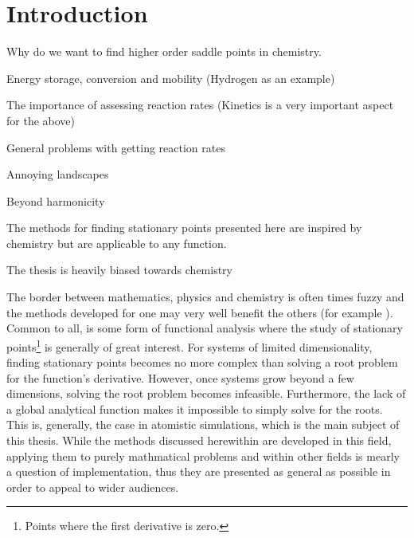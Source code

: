 \chapter{Introduction}
\label{chap:introduction}

\bit
\item Why do we want to find higher order saddle points in chemistry.
\item Energy storage, conversion and mobility (Hydrogen as an example)
\item The importance of assessing reaction rates (Kinetics is a very important aspect for the above)
\item General problems with getting reaction rates
\item Annoying landscapes
\item Beyond harmonicity
\item The methods for finding stationary points presented here are inspired by chemistry but are applicable to any function.
\item The thesis is heavily biased towards chemistry
\eit

The border between mathematics, physics and chemistry is often times fuzzy and the methods developed for one may very well benefit the others (for example \expand \citemiss).
Common to all, is some form of functional analysis where the study of stationary points\footnote{Points where the first derivative is zero.} is generally of great interest.
For systems of limited dimensionality, finding stationary points becomes no more complex than solving a root problem for the function's derivative.
However, once systems grow beyond a few dimensions, solving the root problem becomes infeasible.
Furthermore, the lack of a global analytical function  makes it impossible to simply solve for the roots.
This is, generally, the case in atomistic simulations, which is the main subject of this thesis.
While the methods discussed herewithin are developed in this field, applying them to purely mathmatical problems and within other fields is mearly a question of implementation, thus they are presented as general as possible in order to appeal to wider audiences.


